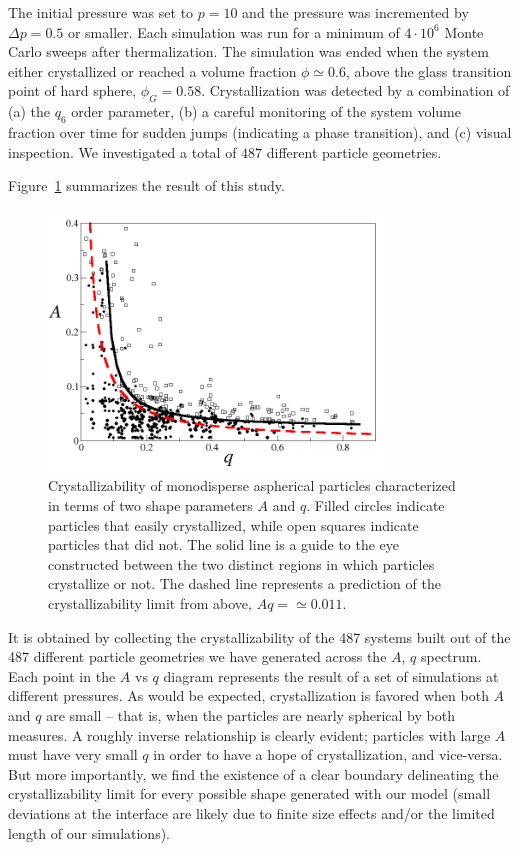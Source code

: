 The initial pressure was set to $p = 10$ and the pressure was incremented by $\Delta p = 0.5$ or smaller.
Each simulation was run for a minimum of $4 \cdot 10^6$ Monte Carlo sweeps after thermalization.
The simulation was ended when the system either crystallized or reached a volume fraction $\phi \simeq 0.6$, above the glass transition point of hard sphere, $\phi_G = 0.58$.
Crystallization was detected by a combination of (a) the $q_6$ order parameter, (b) a careful monitoring of the system volume fraction over time for sudden jumps (indicating a phase transition), and (c) visual inspection.
We investigated a total of $487$ different particle geometries. 

Figure~\ref{mono1} summarizes the result of this study. 
\begin{figure}
	\begin{center}\includegraphics[width=0.8\textwidth]{polydisperse/mono1.png}\end{center}
	\caption[Crystallizability of monodisperse aspherical particles vs. $A$ and $q$]{Crystallizability of monodisperse aspherical particles characterized in terms of two shape parameters $A$ and $q$. Filled circles indicate particles that easily crystallized, while open squares indicate particles that did not.  The solid line is a guide to the eye constructed between the two distinct regions in which particles crystallize or not.  The dashed line represents a prediction of the crystallizability limit from above, $Aq = \simeq 0.011$.}\label{mono1}
\end{figure}
It is obtained by collecting 
the crystallizability of the 487 systems built out of the 487
different particle geometries we have generated across the $A$, $q$ spectrum. 
Each point in the $A$ vs $q$ diagram represents the result of a set of simulations at different pressures.
As would be expected, crystallization is favored when both $A$ and $q$ are small -- that is, 
when the particles are nearly spherical by both measures.  
A roughly inverse relationship is clearly evident; particles with large $A$ must have very small $q$ in order to have
a hope of crystallization, and vice-versa.
But more importantly, we find the existence of a clear boundary delineating the crystallizability limit 
for every possible shape generated with our model (small deviations at the interface are
likely due to finite size effects and/or the limited length of our simulations).

